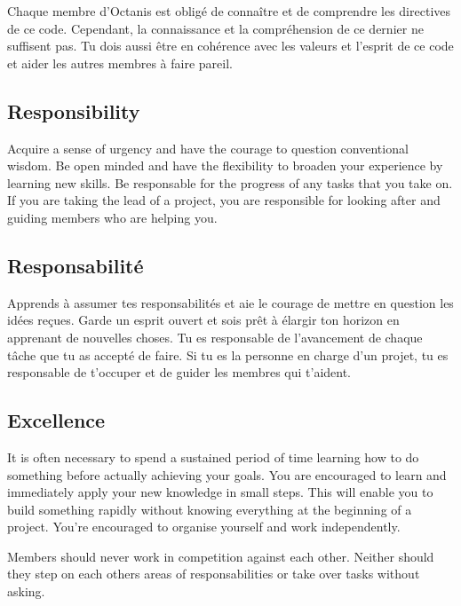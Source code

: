 	Chaque membre d'Octanis est obligé de connaître et de comprendre les directives de ce code.
	Cependant, la connaissance et la compréhension de ce dernier ne suffisent pas. Tu dois aussi être en cohérence avec les valeurs et l'esprit de ce code et aider les autres membres à faire pareil.



	
\english
	\subsection{Responsibility}
	Acquire a sense of urgency and have the courage to question conventional wisdom. Be open minded and have the flexibility to broaden your experience by learning new skills. Be responsable for the progress of any tasks that you take on. If you are taking the lead of a project, you are responsible for looking after and guiding members who are helping you.



\french
	\subsection{Responsabilité}
	Apprends à assumer tes responsabilités et aie le courage de mettre en question les idées reçues. Garde un esprit ouvert et sois prêt à élargir ton horizon en apprenant de nouvelles choses. Tu es responsable de l'avancement de chaque tâche que tu as accepté de faire. Si tu es la personne en charge d'un projet, tu es responsable de t'occuper et de guider les membres qui t'aident. 

\english
	\subsection{Excellence}
 	It is often necessary to spend a sustained period of time learning how to do something before actually achieving your goals. You are encouraged to learn and immediately apply your new knowledge in small steps. This will enable you to build something rapidly without knowing everything at the beginning of a project. You're encouraged to organise yourself and work independently. 
 	

	Members should never work in competition against each other. Neither should they step on each others areas of responsabilities or take over tasks without asking.

	\vspace{1cm}



\french
